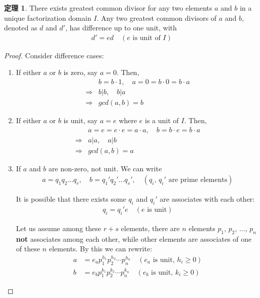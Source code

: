 \documentclass[utf8]{ctexbook}
\theoremstyle{definition}
\newtheorem{prototheorem}{定理}[section]
\newenvironment{theorem}
   {\colorlet{shadecolor}{pink!30}\begin{shaded}\begin{prototheorem}}
   {\end{prototheorem}\end{shaded}}
\begin{document}
\begin{theorem}\label{theorem_UDF_GCD_existence_unique_up_to_unit}
There exists greatest common divisor for any two elements $a$ and $b$ in a unique factorization domain $I$. Any two greatest common divisors of $a$ and $b$, denoted as $d$ and $d'$, has difference up to one unit, with
\begin{align*}
d' = e d \quad (e \mbox{ is unit of } I)
\end{align*} 
\end{theorem}

\begin{proof}
Consider difference cases:
\begin{enumerate}
\item{If either $a$ or $b$ is zero, say $a=0$. Then, 
\begin{align*}
& b = b \cdot 1,\quad a = 0 = b \cdot 0 = b \cdot a \\
 \Longrightarrow & b | b, \quad b | a \\
 \Longrightarrow & gcd(a,b) = b 
\end{align*}
}
\item{If either $a$ or $b$ is unit, say $a=e$ where $e$ is a unit of $I$. Then,
\begin{align*}
& a = e = e \cdot e = a \cdot a, \quad b = b \cdot e = b \cdot a \\
\Longrightarrow & a | a, \quad a | b \\
\Longrightarrow & gcd(a,b) = a 
\end{align*}
}
\item{If $a$ and $b$ are non-zero, not unit. We can write
\begin{align*}
a = q_1 q_2 \ldots q_r, \quad b = q_1 ' q_2 ' \ldots q_s ' , \quad (q_i, \, q_i ' \mbox{ are prime elements})
\end{align*}

It is possible that there exists some $q_i$ and $q_i '$ are associates with each other:
\begin{align*}
q_i = q_i ' e \quad (e \mbox{ is unit})
\end{align*}

Let us assume among these $r+s$ elements, there are $n$ elements $p_1$, $p_2$, $\ldots$, $p_n$ \textbf{not} associates among each other, while other elements are associates of one of these $n$ elements. By this we can rewrite:
\begin{align*}
a &= e_a p_1 ^{h_1} p_2 ^{h_2} \cdots p_n ^{h_n} \quad (e_a \mbox{ is unit},\, h_i \geq 0) \\
b&= e_b p_1 ^{k_1} p_2 ^{k_2} \cdots p_n ^{k_n} \quad (e_b \mbox{ is unit}, \, k_i \geq 0 )   
\end{align*}

}
\end{enumerate}
\end{proof}
\end{document}
